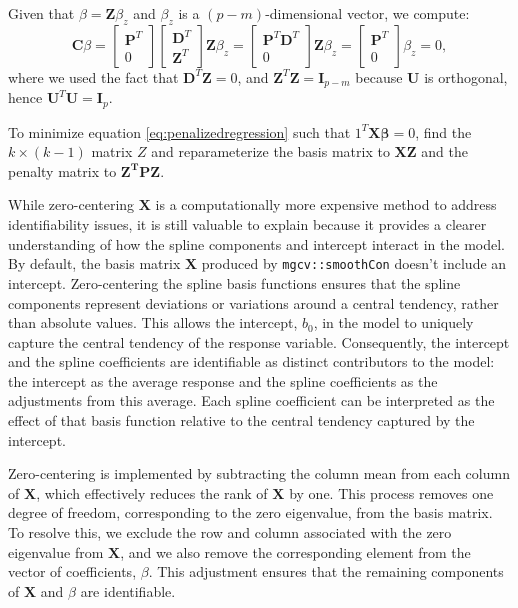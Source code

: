 \documentclass[
11pt, %
oneside, %
english, %
singlespacing, %
]{macthesis} %
\begin{document}
Given that \(\beta = \mathbf{Z}\beta_z\) and \(\beta_z\) is a \((p-m)\)-dimensional vector, we compute:
\[
   \mathbf{C}\beta = \begin{bmatrix} \mathbf{P}^T \\ 0 \end{bmatrix} \begin{bmatrix} \mathbf{D}^T \\ \mathbf{Z}^T \end{bmatrix} \mathbf{Z}\beta_z = \begin{bmatrix} \mathbf{P}^T\mathbf{D}^T \\ 0 \end{bmatrix} \mathbf{Z}\beta_z = \begin{bmatrix} \mathbf{P}^T \\ 0 \end{bmatrix} \beta_z = 0,
   \]
where we used the fact that \(\mathbf{D}^T\mathbf{Z} = 0\), and \(\mathbf{Z}^T\mathbf{Z} = \mathbf{I}_{p-m}\) because \(\mathbf{U}\) is orthogonal, hence \(\mathbf{U}^T\mathbf{U} = \mathbf{I}_p\).

To minimize equation \ref{eq:penalizedregression} such that \(1^T\mathbf{X\beta} = 0\),
find the \(k \times (k-1)\) matrix \(Z\) and reparameterize the basis matrix to \(\mathbf{XZ}\) and the penalty matrix to \(\mathbf{Z^TPZ}\).

While zero-centering \(\mathbf{X}\) is a computationally more expensive method to address identifiability issues, it is still valuable to explain because it provides a clearer understanding of how the spline components and intercept interact in the model. By default, the basis matrix \(\mathbf{X}\) produced by \texttt{mgcv::smoothCon} doesn't include an intercept. Zero-centering the spline basis functions ensures that the spline components represent deviations or variations around a central tendency, rather than absolute values. This allows the intercept, \(b_0\), in the model to uniquely capture the central tendency of the response variable. Consequently, the intercept and the spline coefficients are identifiable as distinct contributors to the model: the intercept as the average response and the spline coefficients as the adjustments from this average. Each spline coefficient can be interpreted as the effect of that basis function relative to the central tendency captured by the intercept.

Zero-centering is implemented by subtracting the column mean from each column of \(\mathbf{X}\), which effectively reduces the rank of \(\mathbf{X}\) by one. This process removes one degree of freedom, corresponding to the zero eigenvalue, from the basis matrix. To resolve this, we exclude the row and column associated with the zero eigenvalue from \(\mathbf{X}\), and we also remove the corresponding element from the vector of coefficients, \(\beta\). This adjustment ensures that the remaining components of \(\mathbf{X}\) and \(\beta\) are identifiable.
\end{document}
